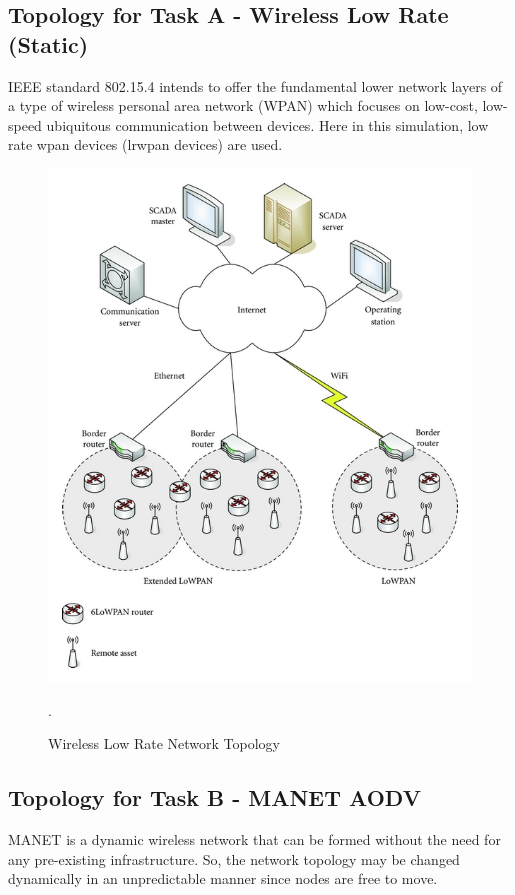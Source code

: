 \documentclass[12pt, a4paper]{article}
\begin{document}
\subsection{Topology for Task A - Wireless Low Rate (Static)}
IEEE standard 802.15.4 intends to offer the fundamental lower network layers of a type of wireless personal area network (WPAN) which focuses on low-cost, low-speed ubiquitous communication between devices.
Here in this simulation, low rate wpan devices (lrwpan devices) are used.
\begin{figure}[H]
\centering
\includegraphics[scale = 1]{images/6LoWPAN.png}
\caption{Wireless Low Rate Network Topology}.
\label{fig:task_a_wired}
\end{figure}
\subsection{Topology for Task B - MANET AODV}
MANET is a dynamic wireless network that can be formed without the need for any pre-existing infrastructure. So, the network topology may be changed dynamically in an unpredictable manner since nodes are free to move.
\end{document}

